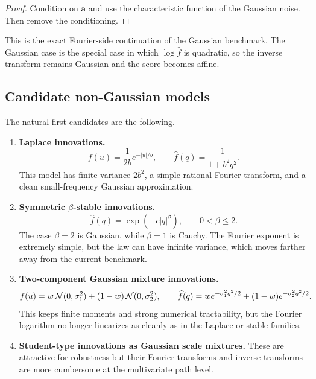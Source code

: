 \documentclass[11pt]{article}
\begin{document}
\begin{proof}
Condition on $\mathbf a$ and use the characteristic function of the Gaussian noise. Then remove the conditioning.
\end{proof}

This is the exact Fourier-side continuation of the Gaussian benchmark. The Gaussian case is the special case in which $\log \widehat f$ is quadratic, so the inverse transform remains Gaussian and the score becomes affine.

\subsection{Candidate non-Gaussian models}

The natural first candidates are the following.

\begin{enumerate}[label=\textbf{C\arabic*.},leftmargin=1.2cm]
\item \textbf{Laplace innovations.}
\begin{equation}
 f(u)=\frac{1}{2b}e^{-|u|/b},
 \qquad
 \widehat f(q)=\frac{1}{1+b^2q^2}.
\end{equation}
This model has finite variance $2b^2$, a simple rational Fourier transform, and a clean small-frequency Gaussian approximation.

\item \textbf{Symmetric $\beta$-stable innovations.}
\begin{equation}
 \widehat f(q)=\exp(-c|q|^\beta),
 \qquad 0<\beta\leq 2.
\end{equation}
The case $\beta=2$ is Gaussian, while $\beta=1$ is Cauchy. The Fourier exponent is extremely simple, but the law can have infinite variance, which moves farther away from the current benchmark.

\item \textbf{Two-component Gaussian mixture innovations.}
\begin{equation}
 f(u)=w\,\mathcal{N}(0,\sigma_1^2)+(1-w)\,\mathcal{N}(0,\sigma_2^2),
 \qquad
 \widehat f(q)=we^{-\sigma_1^2q^2/2}+(1-w)e^{-\sigma_2^2q^2/2}.
\end{equation}
This keeps finite moments and strong numerical tractability, but the Fourier logarithm no longer linearizes as cleanly as in the Laplace or stable families.

\item \textbf{Student-type innovations as Gaussian scale mixtures.}
These are attractive for robustness but their Fourier transforms and inverse transforms are more cumbersome at the multivariate path level.
\end{enumerate}
\end{document}
